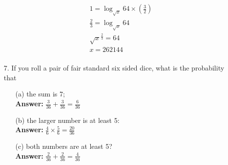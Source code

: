 \documentclass[a4paper]{article}
\begin{document}
\begin{itemize}
\begin{equation}
\begin{split}
	      		1 = \log_{\sqrt{x}} 64 \times (\frac{3}{2}) \\
	      		\frac{2}{3} = \log_{\sqrt{x}} 64 \\
	      		\sqrt{x}^{\frac{2}{3}} = 64 \\
	      		x = 262144 \\
	      	\end{split}
	      \end{equation}
	\item[7.] If you roll a pair of fair standard six sided dice, what is the probability that
	      \begin{itemize}
	      	\item[(a)] the sum is 7; \\
	      	      \textbf{Answer:} $\frac{3}{36} + \frac{3}{36} = \frac{6}{36}$
	      	\item[(b)] the larger number is at least 5: \\
	      	      \textbf{Answer:} $\frac{4}{6} \times \frac{5}{6} = \frac{20}{36}$
	      	\item[(c)] both numbers are at least 5? \\
	      	      \textbf{Answer:} $\frac{2}{36} + \frac{2}{36} = \frac{4}{36}$
	      \end{itemize}   
\end{itemize}
\end{document}
